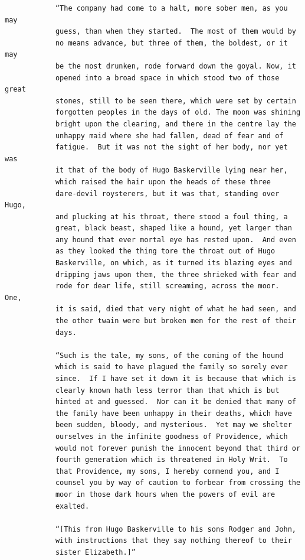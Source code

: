 \documentclass{article}
\begin{document}
\begin{verbatim}
            “The company had come to a halt, more sober men, as you may
            guess, than when they started.  The most of them would by
            no means advance, but three of them, the boldest, or it may
            be the most drunken, rode forward down the goyal. Now, it
            opened into a broad space in which stood two of those great
            stones, still to be seen there, which were set by certain
            forgotten peoples in the days of old. The moon was shining
            bright upon the clearing, and there in the centre lay the
            unhappy maid where she had fallen, dead of fear and of
            fatigue.  But it was not the sight of her body, nor yet was
            it that of the body of Hugo Baskerville lying near her,
            which raised the hair upon the heads of these three
            dare-devil roysterers, but it was that, standing over Hugo,
            and plucking at his throat, there stood a foul thing, a
            great, black beast, shaped like a hound, yet larger than
            any hound that ever mortal eye has rested upon.  And even
            as they looked the thing tore the throat out of Hugo
            Baskerville, on which, as it turned its blazing eyes and
            dripping jaws upon them, the three shrieked with fear and
            rode for dear life, still screaming, across the moor.  One,
            it is said, died that very night of what he had seen, and
            the other twain were but broken men for the rest of their
            days.

            “Such is the tale, my sons, of the coming of the hound
            which is said to have plagued the family so sorely ever
            since.  If I have set it down it is because that which is
            clearly known hath less terror than that which is but
            hinted at and guessed.  Nor can it be denied that many of
            the family have been unhappy in their deaths, which have
            been sudden, bloody, and mysterious.  Yet may we shelter
            ourselves in the infinite goodness of Providence, which
            would not forever punish the innocent beyond that third or
            fourth generation which is threatened in Holy Writ.  To
            that Providence, my sons, I hereby commend you, and I
            counsel you by way of caution to forbear from crossing the
            moor in those dark hours when the powers of evil are
            exalted.

            “[This from Hugo Baskerville to his sons Rodger and John,
            with instructions that they say nothing thereof to their
            sister Elizabeth.]”


\end{verbatim}
\end{document}
